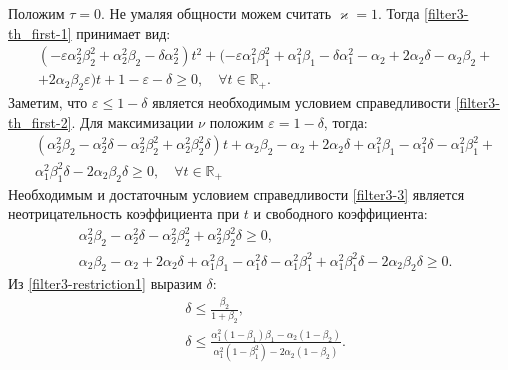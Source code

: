 \documentclass[a4paper,article,14pt]{extarticle}
\begin{document}
Положим $\tau = 0$. Не умаляя общности можем считать $\varkappa = 1$. Тогда \eqref{filter3-th_first-1} принимает вид:
 \begin{equation}\label{filter3-th_first-2}
 \begin{aligned}
&(-\varepsilon\alpha_2^2\beta_2^2 + \alpha_2^2\beta_2 - \delta\alpha_2^2)t^2 + (-\varepsilon\alpha_1^2\beta_1^2 + \alpha_1^2\beta_1 - \delta\alpha_1^2 - \alpha_2 + 2\alpha_2\delta - \alpha_2\beta_2 +\\
&+ 2\alpha_2\beta_2\varepsilon)t + 1 - \varepsilon - \delta \geqslant 0, \quad \forall t \in \mathbb{R_+}.
 \end{aligned}
\end{equation}
Заметим, что $\varepsilon \leqslant 1 - \delta$ является необходимым условием справедливости \eqref{filter3-th_first-2}. Для максимизации $\nu$ положим $\varepsilon = 1-\delta$, тогда:
 \begin{equation}\label{filter3-3}
 \begin{aligned}
&(\alpha_2^2\beta_2 - \alpha_2^2\delta - \alpha_2^2\beta_2^2 + \alpha_2^2\beta_2^2\delta)t + \alpha_2\beta_2 - \alpha_2 + 2\alpha_2\delta + \alpha_1^2\beta_1 - \alpha_1^2\delta - \alpha_1^2\beta_1^2 + \\
&\alpha_1^2\beta_1^2\delta - 2\alpha_2\beta_2\delta \geqslant 0, \quad \forall t \in \mathbb{R_+}
 \end{aligned}
\end{equation}
Необходимым и достаточным условием справедливости \eqref{filter3-3} является неотрицательность коэффициента при $t$ и свободного коэффициента:
 \begin{equation}\label{filter3-restriction1}
 \begin{aligned}
&\alpha_2^2\beta_2 - \alpha_2^2\delta - \alpha_2^2\beta_2^2 + \alpha_2^2\beta_2^2\delta \geqslant 0,\\ 
&\alpha_2\beta_2 - \alpha_2 + 2\alpha_2\delta + \alpha_1^2\beta_1 - \alpha_1^2\delta - \alpha_1^2\beta_1^2 + \alpha_1^2\beta_1^2\delta - 2\alpha_2\beta_2\delta \geqslant 0.
 \end{aligned}
\end{equation}
Из \eqref{filter3-restriction1} выразим $\delta$:
 \begin{align}
&\delta \leqslant \frac{\beta_2}{1+\beta_2}, \label{t_coef}\\
&\delta \leqslant \frac{\alpha_1^2(1-\beta_1)\beta_1 - \alpha_2(1-\beta_2)}{\alpha_1^2(1-\beta_1^2) - 2\alpha_2(1-\beta_2)}. \label{free_coef}
 \end{align}
\end{document}
